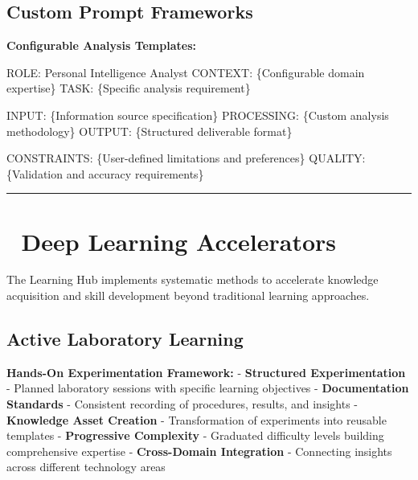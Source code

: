 \documentclass[
  letterpaper,
  DIV=11,
  numbers=noendperiod]{scrartcl}
\newenvironment{Shaded}{\begin{snugshade}}{\end{snugshade}}
\newcommand{\NormalTok}[1]{\textcolor[rgb]{0.00,0.23,0.31}{#1}}
\begin{document}
\subsection{Custom Prompt Frameworks}\label{custom-prompt-frameworks}

\textbf{Configurable Analysis Templates:}

\begin{Shaded}
\begin{Highlighting}[]
\NormalTok{ROLE: Personal Intelligence Analyst}
\NormalTok{CONTEXT: \{Configurable domain expertise\}}
\NormalTok{TASK: \{Specific analysis requirement\}}

\NormalTok{INPUT: \{Information source specification\}}
\NormalTok{PROCESSING: \{Custom analysis methodology\}}
\NormalTok{OUTPUT: \{Structured deliverable format\}}

\NormalTok{CONSTRAINTS: \{User{-}defined limitations and preferences\}}
\NormalTok{QUALITY: \{Validation and accuracy requirements\}}
\end{Highlighting}
\end{Shaded}

\begin{center}\rule{0.5\linewidth}{0.5pt}\end{center}

\section{🚀 Deep Learning
Accelerators}\label{deep-learning-accelerators}

The Learning Hub implements systematic methods to accelerate knowledge
acquisition and skill development beyond traditional learning
approaches.

\subsection{Active Laboratory
Learning}\label{active-laboratory-learning}

\textbf{Hands-On Experimentation Framework:} - \textbf{Structured
Experimentation} - Planned laboratory sessions with specific learning
objectives - \textbf{Documentation Standards} - Consistent recording of
procedures, results, and insights - \textbf{Knowledge Asset Creation} -
Transformation of experiments into reusable templates -
\textbf{Progressive Complexity} - Graduated difficulty levels building
comprehensive expertise - \textbf{Cross-Domain Integration} - Connecting
insights across different technology areas
\end{document}
